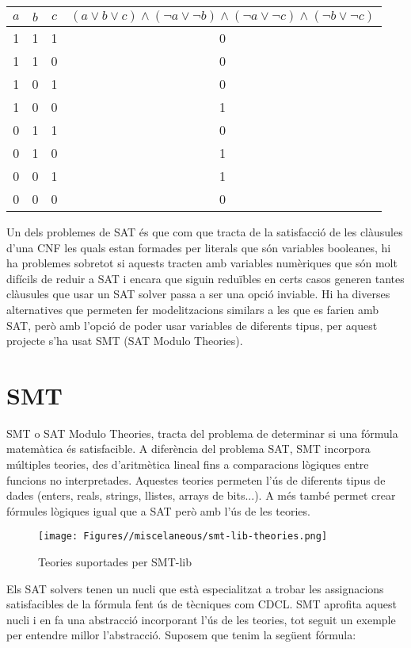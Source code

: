 \begin{tabular}{ccc|c}
$a$ & $b$ & $c$ & $(a \lor b \lor c) \land (\lnot a \lor \lnot b) \land (\lnot a \lor \lnot c) \land (\lnot b \lor \lnot c)$ \\
\hline
1 & 1 & 1 & 0 \\
1 & 1 & 0 & 0 \\
1 & 0 & 1 & 0 \\
1 & 0 & 0 & 1 \\
0 & 1 & 1 & 0 \\
0 & 1 & 0 & 1 \\
0 & 0 & 1 & 1 \\
0 & 0 & 0 & 0 \\
\end{tabular}

Un dels problemes de SAT és que com que tracta de la satisfacció de les clàusules d'una CNF les quals estan formades per literals que són variables booleanes, hi ha problemes sobretot si aquests tracten amb variables numèriques que són molt difícils de reduir a SAT i encara que siguin reduïbles en certs casos generen tantes clàusules que usar un SAT solver passa a ser una opció inviable. Hi ha diverses alternatives que permeten fer modelitzacions similars a les que es farien amb SAT, però amb l'opció de poder usar variables de diferents tipus, per aquest projecte s'ha usat SMT (SAT Modulo Theories).

\section{SMT}
SMT o SAT Modulo Theories, tracta del problema de determinar si una fórmula matemàtica és satisfacible. A diferència del problema SAT, SMT incorpora múltiples teories, des d'aritmètica lineal fins a comparacions lògiques entre funcions no interpretades. Aquestes teories permeten l'ús de diferents tipus de dades (enters, reals, strings, llistes, arrays de bits...). A més també permet crear fórmules lògiques igual que a SAT però amb l'ús de les teories.\\
\begin{figure}
    \centering
    \texttt{[image: Figures//miscelaneous/smt-lib-theories.png]}
    \caption{Teories suportades per SMT-lib \cite{SMT-solving}}
    \label{fig:smt-theories}
\end{figure}

Els SAT solvers tenen un nucli que està especialitzat a trobar les assignacions satisfacibles de la fórmula fent ús de tècniques com CDCL. SMT aprofita aquest nucli i en fa una abstracció incorporant l'ús de les teories, tot seguit un exemple per entendre millor l'abstracció.
Suposem que tenim la següent fórmula:

